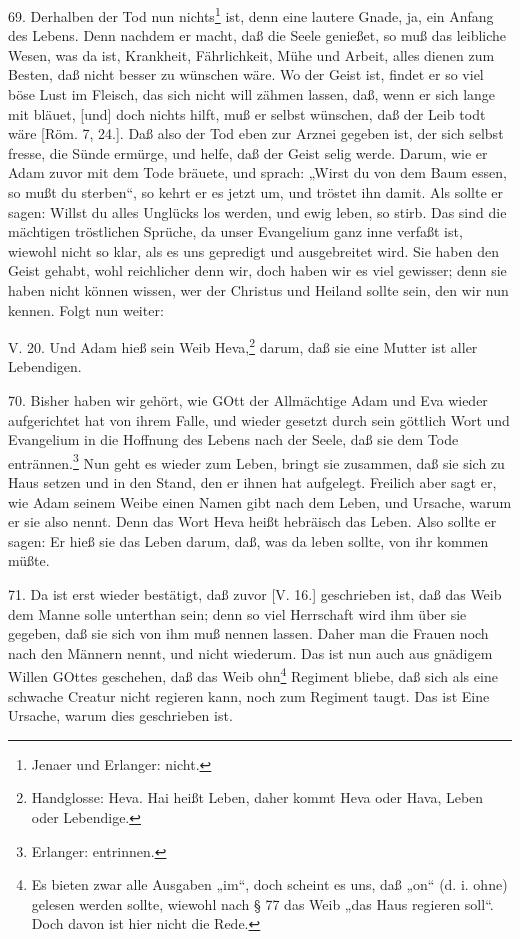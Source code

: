 69. Derhalben der Tod nun nichts\footnote{Jenaer und Erlanger: nicht.} ist, denn eine lautere Gnade, ja, ein Anfang des Lebens. Denn nachdem er macht, daß die Seele genießet, so muß das leibliche Wesen, was da ist, Krankheit, Fährlichkeit, Mühe und Arbeit, alles dienen zum Besten, daß nicht besser zu wünschen wäre. Wo der Geist ist, findet er so viel böse Lust im Fleisch, das sich nicht will zähmen lassen, daß, wenn er sich lange mit bläuet, [und] doch nichts hilft, muß er selbst wünschen, daß der Leib todt wäre [Röm. 7, 24.]. Daß also der Tod eben zur Arznei gegeben ist, der sich selbst fresse, die Sünde ermürge, und helfe, daß der Geist selig werde. Darum, wie er Adam zuvor mit dem Tode bräuete, und sprach: „Wirst du von dem Baum essen, so mußt du sterben“, so kehrt er es jetzt um, und tröstet ihn damit. Als sollte er sagen: Willst du alles Unglücks los werden, und ewig leben, so stirb. Das sind die mächtigen tröstlichen Sprüche, da unser Evangelium ganz inne verfaßt ist, wiewohl nicht so klar, als es uns gepredigt und ausgebreitet wird. Sie haben den Geist gehabt, wohl reichlicher denn wir, doch haben wir es viel gewisser; denn sie haben nicht können wissen, wer der Christus und Heiland sollte sein, den wir nun kennen. Folgt nun weiter:

\begin{schriftzitat}
V. 20. Und Adam hieß sein Weib Heva,\footnote{Handglosse: Heva. Hai heißt Leben, daher kommt Heva oder Hava, Leben oder Lebendige.} darum, daß sie eine Mutter ist aller Lebendigen.
\end{schriftzitat}

70. Bisher haben wir gehört, wie GOtt der Allmächtige Adam und Eva wieder aufgerichtet hat von ihrem Falle, und wieder gesetzt durch sein göttlich Wort und Evangelium in die Hoffnung des Lebens nach der Seele, daß sie dem Tode entrännen.\footnote{Erlanger: entrinnen.} Nun geht es wieder zum
Leben, bringt sie zusammen, daß sie sich zu Haus setzen und in den Stand, den er ihnen hat aufgelegt. Freilich aber sagt er, wie Adam seinem Weibe einen Namen gibt nach dem Leben, und Ursache, warum er sie also nennt. Denn das Wort Heva heißt hebräisch das Leben. Also sollte er sagen: Er hieß sie das Leben darum, daß, was da leben sollte, von ihr kommen müßte.

71. Da ist erst wieder bestätigt, daß zuvor [V. 16.] geschrieben ist, daß das Weib dem Manne solle unterthan sein; denn so viel Herrschaft wird ihm über sie gegeben, daß sie sich von ihm muß nennen lassen. Daher man die Frauen noch nach den Männern nennt, und nicht wiederum. Das ist nun auch aus gnädigem Willen GOttes geschehen, daß das Weib ohn\footnote{Es bieten zwar alle Ausgaben „im“, doch scheint es uns, daß „on“ (d. i. ohne) gelesen werden sollte, wiewohl nach § 77 das Weib „das Haus regieren soll“. Doch davon ist hier nicht die Rede.} Regiment bliebe, daß sich als eine schwache Creatur nicht regieren kann, noch zum Regiment taugt. Das ist Eine Ursache, warum dies geschrieben ist.

